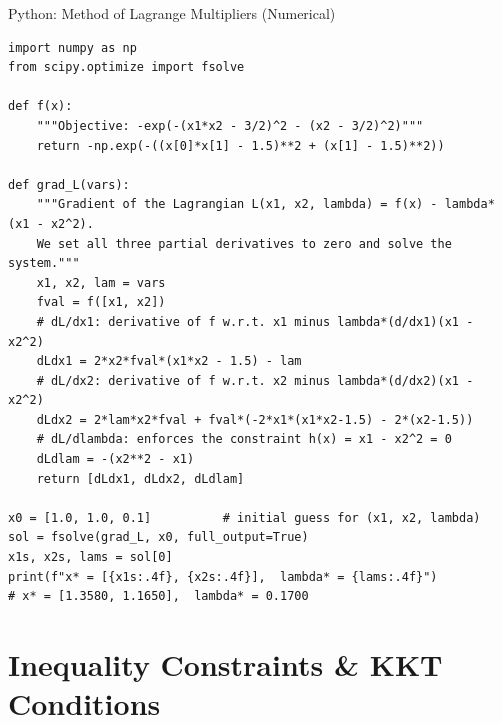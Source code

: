 \documentclass[aspectratio=169,10pt]{beamer}
\begin{document}
\begin{frame}[fragile]{Python: Method of Lagrange Multipliers (Numerical)}
  \begin{lstlisting}[style=pycode,caption={Solve the KKT system for Example 10.4 using fsolve --- find x* and lambda*}]
import numpy as np
from scipy.optimize import fsolve

def f(x):
    """Objective: -exp(-(x1*x2 - 3/2)^2 - (x2 - 3/2)^2)"""
    return -np.exp(-((x[0]*x[1] - 1.5)**2 + (x[1] - 1.5)**2))

def grad_L(vars):
    """Gradient of the Lagrangian L(x1, x2, lambda) = f(x) - lambda*(x1 - x2^2).
    We set all three partial derivatives to zero and solve the system."""
    x1, x2, lam = vars
    fval = f([x1, x2])
    # dL/dx1: derivative of f w.r.t. x1 minus lambda*(d/dx1)(x1 - x2^2)
    dLdx1 = 2*x2*fval*(x1*x2 - 1.5) - lam
    # dL/dx2: derivative of f w.r.t. x2 minus lambda*(d/dx2)(x1 - x2^2)
    dLdx2 = 2*lam*x2*fval + fval*(-2*x1*(x1*x2-1.5) - 2*(x2-1.5))
    # dL/dlambda: enforces the constraint h(x) = x1 - x2^2 = 0
    dLdlam = -(x2**2 - x1)
    return [dLdx1, dLdx2, dLdlam]

x0 = [1.0, 1.0, 0.1]          # initial guess for (x1, x2, lambda)
sol = fsolve(grad_L, x0, full_output=True)
x1s, x2s, lams = sol[0]
print(f"x* = [{x1s:.4f}, {x2s:.4f}],  lambda* = {lams:.4f}")
# x* = [1.3580, 1.1650],  lambda* = 0.1700
  \end{lstlisting}
\end{frame}

\section{Inequality Constraints \& KKT Conditions}
\end{document}
